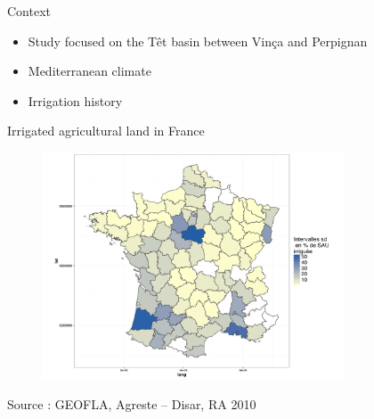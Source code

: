 \documentclass[newPxFont]{beamer}
\begin{document}

\begin{frame}[c]{Context}
\vspace{-2em}
\begin{itemize}
	\item Study focused on the Têt basin between Vinça  and Perpignan
	\item Mediterranean climate
	\item Irrigation history
\end{itemize}
\begin{figure}
	
\end{figure}

\end{frame}


\begin{frame}[c]{Irrigated agricultural land in France}
\vspace{-2em}
\begin{figure}
	\centering
	\includegraphics[width = 0.8\textwidth]{img/SAU}
\end{figure}
\small{Source : GEOFLA, Agreste -- Disar, RA 2010}

\end{frame}
\end{document}
